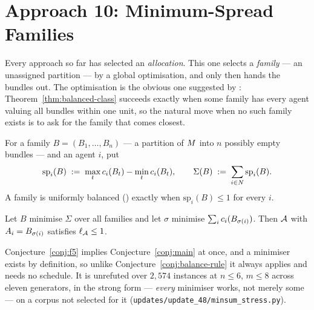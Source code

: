 \section{Approach 10: Minimum-Spread Families}
\label{sec:approach10}

Every approach so far has selected an \emph{allocation}. This one selects a
\emph{family} --- an unassigned partition --- by a global optimisation, and only
then hands the bundles out. The optimisation is the obvious one suggested by
: Theorem~\ref{thm:balanced-class} succeeds exactly when
some family has every agent valuing all bundles within one unit, so the natural
move when no such family exists is to ask for the family that comes closest.

\begin{definition}[Spread]
\label{def:spread}
For a family $B = (B_1,\dots,B_n)$ --- a partition of $M$ into $n$ possibly
empty bundles --- and an agent $i$, put
\[
  \mathrm{sp}_i(B) \;:=\; \max_t c_i(B_t) - \min_t c_i(B_t),
  \qquad
  \Sigma(B) \;:=\; \sum_{i \in N} \mathrm{sp}_i(B).
\]
A family is uniformly balanced () exactly when
$\mathrm{sp}_i(B) \le 1$ for every $i$.
\end{definition}

\begin{conjecture}
\label{conj:f5}
Let $B$ minimise $\Sigma$ over all families and let $\sigma$ minimise
$\sum_i c_i(B_{\sigma(i)})$. Then $\mathcal{A}$ with $A_{i} =
B_{\sigma(i)}$ satisfies $\ell_{\mathcal{A}} \le 1$.
\end{conjecture}

Conjecture~\ref{conj:f5} implies Conjecture~\ref{conj:main} at once, and a
minimiser exists by definition, so unlike Conjecture~\ref{conj:balance-rule} it
always applies and needs no schedule. It is unrefuted over $2{,}574$ instances at
$n \le 6$, $m \le 8$ across eleven generators, in the strong form --- \emph{every}
minimiser works, not merely some --- on a corpus not selected for it
(\texttt{updates/update\_48/minsum\_stress.py}).


